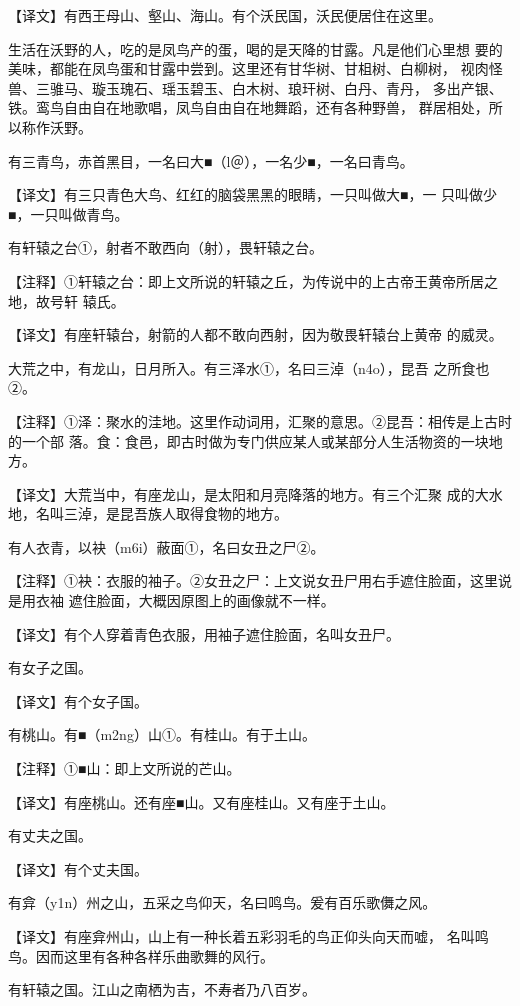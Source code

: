 \documentclass[a4paper,12pt,UTF8,twoside]{ctexbook}
\begin{document}
【译文】有西王母山、壑山、海山。有个沃民国，沃民便居住在这里。

生活在沃野的人，吃的是凤鸟产的蛋，喝的是天降的甘露。凡是他们心里想 要的美味，都能在凤鸟蛋和甘露中尝到。这里还有甘华树、甘柤树、白柳树， 视肉怪兽、三骓马、璇玉瑰石、瑶玉碧玉、白木树、琅玕树、白丹、青丹， 多出产银、铁。鸾鸟自由自在地歌唱，凤鸟自由自在地舞蹈，还有各种野兽， 群居相处，所以称作沃野。

有三青鸟，赤首黑目，一名曰大■（l＠），一名少■，一名曰青鸟。

【译文】有三只青色大鸟、红红的脑袋黑黑的眼睛，一只叫做大■，一 只叫做少■，一只叫做青鸟。

有轩辕之台①，射者不敢西向（射），畏轩辕之台。

【注释】①轩辕之台：即上文所说的轩辕之丘，为传说中的上古帝王黄帝所居之地，故号轩 辕氏。

【译文】有座轩辕台，射箭的人都不敢向西射，因为敬畏轩辕台上黄帝 的威灵。

大荒之中，有龙山，日月所入。有三泽水①，名曰三淖（n4o），昆吾 之所食也②。

【注释】①泽：聚水的洼地。这里作动词用，汇聚的意思。②昆吾：相传是上古时的一个部 落。食：食邑，即古时做为专门供应某人或某部分人生活物资的一块地方。

【译文】大荒当中，有座龙山，是太阳和月亮降落的地方。有三个汇聚 成的大水地，名叫三淖，是昆吾族人取得食物的地方。

有人衣青，以袂（m6i）蔽面①，名曰女丑之尸②。

【注释】①袂：衣服的袖子。②女丑之尸：上文说女丑尸用右手遮住脸面，这里说是用衣袖 遮住脸面，大概因原图上的画像就不一样。

【译文】有个人穿着青色衣服，用袖子遮住脸面，名叫女丑尸。

有女子之国。

【译文】有个女子国。

有桃山。有■（m2ng）山①。有桂山。有于土山。

【注释】①■山：即上文所说的芒山。

【译文】有座桃山。还有座■山。又有座桂山。又有座于土山。

有丈夫之国。

【译文】有个丈夫国。

有弇（y1n）州之山，五采之鸟仰天，名曰鸣鸟。爰有百乐歌儛之风。

【译文】有座弇州山，山上有一种长着五彩羽毛的鸟正仰头向天而嘘， 名叫鸣鸟。因而这里有各种各样乐曲歌舞的风行。

有轩辕之国。江山之南栖为吉，不寿者乃八百岁。
\end{document}
